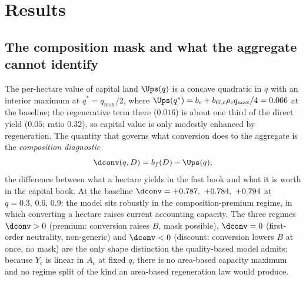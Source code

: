\section{Results}\label{sec:results}

\subsection{The composition mask and what the aggregate cannot identify}\label{sec:mask}

The per-hectare value of capital land $\Ups(q)$ is a concave quadratic in $q$ with an interior maximum at $q^*=q_{\max}/2$, where $\Ups(q^*)=b_c+b_{G,c}\rho_c q_{\max}/4=0.066$ at the baseline; the regenerative term there ($0.016$) is about one third of the direct yield ($0.05$; ratio $0.32$), so capital value is only modestly enhanced by regeneration. The quantity that governs what conversion does to the aggregate is the \emph{composition diagnostic}
\begin{equation}\label{eq:dconv}
\dconv(q,D)=b_f(D)-\Ups(q),
\end{equation}
the difference between what a hectare yields in the fast book and what it is worth in the capital book. At the baseline $\dconv=+0.787,\ +0.784,\ +0.794$ at $q=0.3,\,0.6,\,0.9$: the model sits robustly in the composition-premium regime, in which converting a hectare raises current accounting capacity. The three regimes $\dconv>0$ (premium: conversion raises $B$, mask possible), $\dconv=0$ (first-order neutrality, non-generic) and $\dconv<0$ (discount: conversion lowers $B$ at once, no mask) are the only shape distinction the quality-based model admits; because $Y_c$ is linear in $A_c$ at fixed $q$, there is no area-based capacity maximum and no regime split of the kind an area-based regeneration law would produce.

